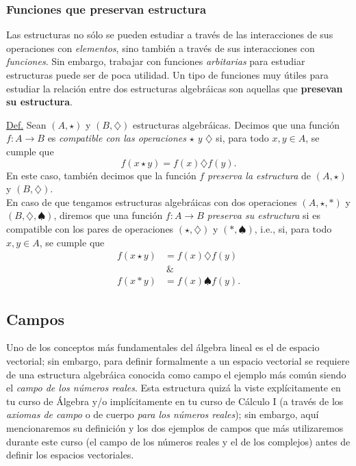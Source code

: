 \documentclass[apuntes]{subfiles}
\begin{document}
\subsubsection{Funciones que preservan estructura} \label{Sssec: Funciones que preservan estructura}

Las estructuras no sólo se pueden estudiar a través de las interacciones de sus operaciones con \emph{elementos}, sino también a través de sus interacciones con \emph{funciones}. Sin embargo, trabajar con funciones \emph{arbitarias} para estudiar estructuras puede ser de poca utilidad. Un tipo de funciones muy útiles para estudiar la relación entre dos estructuras algebráicas son aquellas que \textbf{presevan su estructura}.

\begin{tcolorbox}
    
    \underline{Def.} Sean $(A,\star)$ y $(B,\diamondsuit)$ estructuras algebráicas. Decimos que una función $f:A\to B$ es \emph{compatible con las operaciones} $\star$ \emph{y} $\diamondsuit$ si, para todo $x,y\in A$, se cumple que
    \[
        f(x\star y) = f(x)\diamondsuit f(y).
    \]
    \noindent En este caso, también decimos que la función $f$ \emph{preserva la estructura} de $(A,\star)$ y $(B,\diamondsuit)$. \\

    En caso de que tengamos estructuras algebráicas con dos operaciones $(A,\star,\ast)$ y $(B,\diamondsuit,\spadesuit)$, diremos que una función $f:A\to B$ \emph{preserva su estructura} si es compatible con los pares de operaciones $(\star,\diamondsuit)$ y $(\ast,\spadesuit)$, i.e., si, para todo $x,y\in A$, se cumple que
    \begin{align*}
        f(x\star y) &= f(x)\diamondsuit f(y) \\
                    & \ \& \\
        f(x\ast y) &= f(x)\spadesuit f(y).
    \end{align*}
\end{tcolorbox}

\subsection{Campos} \label{Ssec: Campos}
Uno de los conceptos más fundamentales del álgebra lineal es el de espacio vectorial; sin embargo, para definir formalmente a un espacio vectorial se requiere de una estructura algebráica conocida como campo \textemdash el ejemplo más común siendo el \emph{campo de los números reales}. Esta estructura quizá la viste explícitamente en tu curso de Álgebra y/o implícitamente en tu curso de Cálculo I (a través de los \textit{axiomas de campo} \textemdash o de cuerpo\textemdash\hspace{1.5mm} \textit{para los números reales}); sin embargo, aquí mencionaremos su definición y los dos ejemplos de campos que más utilizaremos durante este curso (el campo de los números reales y el de los complejos) antes de definir los espacios vectoriales.
\end{document}
